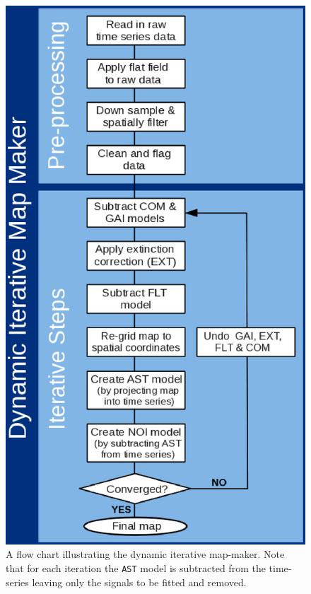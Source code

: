 \documentclass[twoside,11pt]{article}
\renewcommand{\_}{\texttt{\symbol{95}}}
\begin{document}
\begin{figure}
\begin{center}
\includegraphics[width=0.78\linewidth]{flow_dimm_blue.eps}
\caption{\small A flow chart illustrating the dynamic iterative map-maker. Note that for each iteration the \texttt{AST} model is subtracted from the time-series leaving only the signals to be fitted and removed.}
\label{fig:dimm}
\end{center}
\end{figure}
\end{document}
